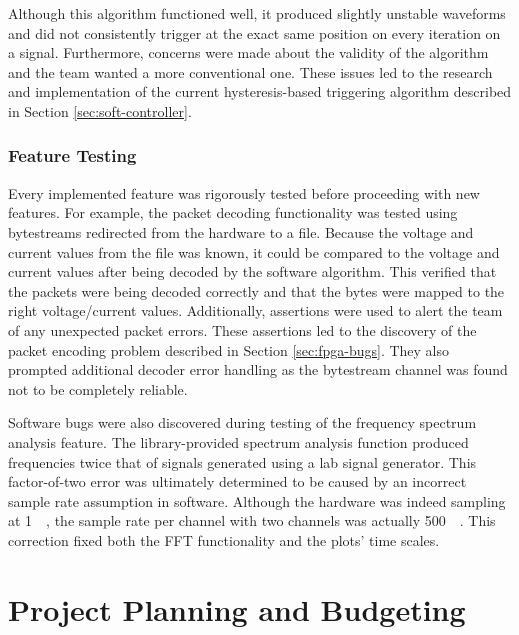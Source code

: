 \documentclass[letterpaper,11pt]{article}
\begin{document}
Although this algorithm functioned well, it produced slightly unstable
waveforms and did not consistently trigger at the exact same position on every
iteration on a signal. Furthermore, concerns were made about the validity of
the algorithm and the team wanted a more conventional one. These issues led to
the research and implementation of the current hysteresis-based triggering
algorithm described in Section \ref{sec:soft-controller}.

\subsubsection{Feature Testing}
Every implemented feature was rigorously tested before proceeding with new features.
For example, the packet decoding functionality was tested using bytestreams
redirected from the hardware to a file. Because the voltage and current values
from the file was known, it could be compared to the voltage and current values
after being decoded by the software algorithm. This verified that the packets
were being decoded correctly and that the bytes were mapped to the right
voltage/current values. Additionally, assertions were used to alert the team
of any unexpected packet errors. These assertions led to the discovery of the
packet encoding problem described in Section \ref{sec:fpga-bugs}. They also
prompted additional decoder error handling as the bytestream channel was found
not to be completely reliable.

Software bugs were also discovered during testing of the frequency spectrum
analysis feature. The library-provided spectrum analysis function produced
frequencies twice that of signals generated using a lab signal generator.
This factor-of-two error was ultimately determined to be caused by an
incorrect sample rate assumption in software. Although the hardware was
indeed sampling at \SI{1}{\mega\samplepersec}, the sample rate per channel
with two channels was actually \SI{500}{\kilo\samplepersec}. This correction
fixed both the FFT functionality and the plots' time scales.

\section{Project Planning and Budgeting} %
\end{document}
